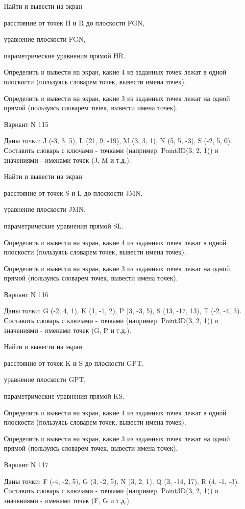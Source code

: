 \documentclass[11pt]{report}
\begin{document}
Найти и вывести на экран


расстояние от точек H и R до плоскости FGN,


уравнение плоскости FGN,


параметрические уравнения прямой HR.


Определить и вывести на экран, какие 4 из заданных точек лежат в одной плоскости (пользуясь словарем точек, вывести имена точек).


Определить и вывести на экран, какие 3 из заданных точек лежат на одной прямой (пользуясь словарем точек, вывести имена точек).

\newpage
Вариант N 115

Даны точки: J (-3, 3, 5), L (21, 9, -19), M (3, 3, 1), N (5, 5, -3), S (-2, 5, 0).
Составить словарь с ключами - точками (например, Point3D(3, 2, 1)) и значениями - именами точек (J, M и т.д.).


Найти и вывести на экран


расстояние от точек S и L до плоскости JMN,


уравнение плоскости JMN,


параметрические уравнения прямой SL.


Определить и вывести на экран, какие 4 из заданных точек лежат в одной плоскости (пользуясь словарем точек, вывести имена точек).


Определить и вывести на экран, какие 3 из заданных точек лежат на одной прямой (пользуясь словарем точек, вывести имена точек).

\newpage
Вариант N 116

Даны точки: G (-2, 4, 1), K (1, -1, 2), P (3, -3, 5), S (13, -17, 13), T (-2, -4, 3).
Составить словарь с ключами - точками (например, Point3D(3, 2, 1)) и значениями - именами точек (G, P и т.д.).


Найти и вывести на экран


расстояние от точек K и S до плоскости GPT,


уравнение плоскости GPT,


параметрические уравнения прямой KS.


Определить и вывести на экран, какие 4 из заданных точек лежат в одной плоскости (пользуясь словарем точек, вывести имена точек).


Определить и вывести на экран, какие 3 из заданных точек лежат на одной прямой (пользуясь словарем точек, вывести имена точек).

\newpage
Вариант N 117

Даны точки: F (-4, -2, 5), G (3, -2, 5), N (3, 2, 1), Q (3, -14, 17), R (4, -1, -3).
Составить словарь с ключами - точками (например, Point3D(3, 2, 1)) и значениями - именами точек (F, G и т.д.).
\end{document}

